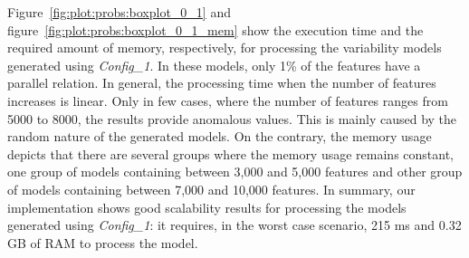 Figure~\ref{fig:plot:probs:boxplot_0_1} and figure~\ref{fig:plot:probs:boxplot_0_1_mem} show the execution time and the required amount of memory, respectively, for processing the variability models generated using \textit{Config\_1}. In these models, only 1\% of the features have a parallel relation. In general, the processing time when the number of features increases is linear. Only in few cases, where the number of features ranges from 5000 to 8000, the results provide anomalous values. This is mainly caused by the random nature of the generated models. On the contrary, the memory usage depicts that there are several groups where the memory usage remains constant, one group of models containing between 3,000 and 5,000 features and other group of models containing between 7,000 and 10,000 features. In summary, our implementation shows good scalability results for processing the models generated using \textit{Config\_1}: it requires, in the worst case scenario, 215 ms and 0.32 GB of RAM to process the model.

